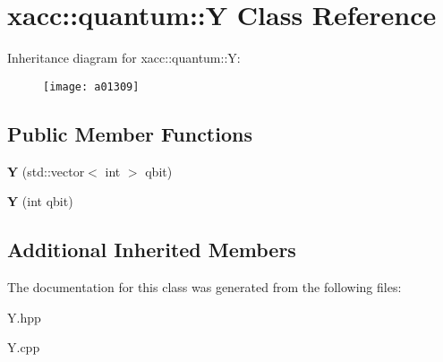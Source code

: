 \hypertarget{a01309}{}\section{xacc\+:\+:quantum\+:\+:Y Class Reference}
\label{a01309}
Inheritance diagram for xacc\+:\+:quantum\+:\+:Y\+:\begin{figure}[H]
\begin{center}
\leavevmode
\texttt{[image: a01309]}
\end{center}
\end{figure}
\subsection*{Public Member Functions}
\begin{DoxyCompactItemize}
\item 
\mbox{\label{a01309_a7959be0aa8221c0b1ba445771f5ecf0a}} 
{\bfseries Y} (std\+::vector$<$ int $>$ qbit)
\item 
\mbox{\label{a01309_aea2b37ac45208cbf6a47e0074e4a9653}} 
{\bfseries Y} (int qbit)
\end{DoxyCompactItemize}
\subsection*{Additional Inherited Members}


The documentation for this class was generated from the following files\+:\begin{DoxyCompactItemize}
\item 
Y.\+hpp\item 
Y.\+cpp\end{DoxyCompactItemize}
